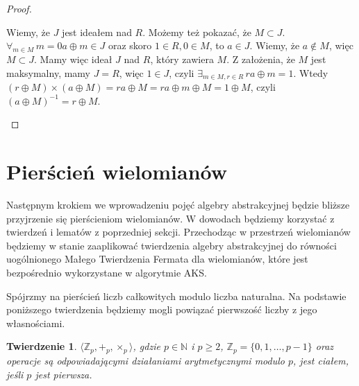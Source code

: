 \documentclass[polish,declaration,shortabstract]{iithesis}
\theoremstyle{definition}
\theoremstyle{remark} \newtheorem{observation}{Obserwacja}
\theoremstyle{plain} \newtheorem{theorem}{Twierdzenie}
\theoremstyle{plain} \newtheorem{lemma}{Lemat}
\theoremstyle{remark} \newtheorem*{remark*}{Uwaga}
\theoremstyle{reminder} \newtheorem*{reminder*}{Przypomnienie}
\begin{document}
\begin{proof}
\begin{enumerate}[label=(\arabic*),leftmargin=.4in]
\begin{enumerate}[label=(2.\arabic*)]
		      	      \newline
		      	      Wiemy, że $J$ jest ideałem nad $R$. Możemy też pokazać, że $M \subset J$. $\forall_{m \in M} \, m = 0a \oplus m \in J$ oraz skoro $1 \in R, 0 \in M$, to $a \in J$. Wiemy, że $a \notin M$, więc $M \subset J$.
		      	      \newline
		      	      Mamy więc ideał $J$ nad $R$, który zawiera $M$. Z założenia, że $M$ jest maksymalny, mamy $J = R$, więc $1 \in J$, czyli $\exists_{m \in M, r \in R} \, ra \oplus m = 1$. Wtedy $(r \oplus M) \times (a \oplus M) = ra \oplus M = ra \oplus m \oplus M = 1 \oplus M$, czyli $(a \oplus M)^{-1} = r \oplus M$.
		      \end{enumerate}
	\end{enumerate}
\end{proof}

\section{Pierścień wielomianów}

Następnym krokiem we wprowadzeniu pojęć algebry abstrakcyjnej będzie bliższe przyjrzenie się pierścieniom wielomianów. W dowodach będziemy korzystać z twierdzeń i lematów z poprzedniej sekcji. Przechodząc w przestrzeń wielomianów będziemy w stanie zaaplikować twierdzenia algebry abstrakcyjnej do równości uogólnionego Małego Twierdzenia Fermata dla wielomianów, które jest bezpośrednio wykorzystane w algorytmie AKS.

Spójrzmy na pierścień liczb całkowitych modulo liczba naturalna. Na podstawie poniższego twierdzenia będziemy mogli powiązać pierwszość liczby z jego własnościami.

\begin{theorem}
	$\langle \mathbb{Z}_p, +_p, \times_p \rangle$, gdzie $p \in \mathbb{N}$ i $p \geq 2$,  $\mathbb{Z}_p = \{0, 1, \ldots, p-1\}$ oraz operacje są odpowiadającymi działaniami arytmetycznymi modulo $p$, jest ciałem, jeśli $p$ jest pierwsza.
\end{theorem}
\end{document}
